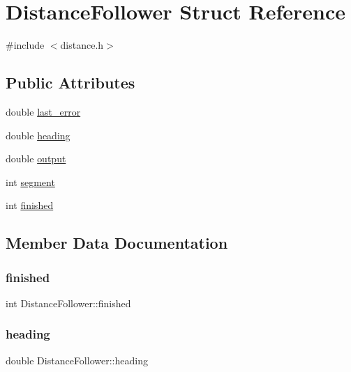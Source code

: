 \hypertarget{structDistanceFollower}{}\section{Distance\+Follower Struct Reference}
\label{structDistanceFollower}


{\ttfamily \#include $<$distance.\+h$>$}

\subsection*{Public Attributes}
\begin{DoxyCompactItemize}
\item 
double \mbox{\hyperlink{structDistanceFollower_a39217b0b0d11fac687ef1f7184e1662f}{last\+\_\+error}}
\item 
double \mbox{\hyperlink{structDistanceFollower_a4277eb5f873add0a3a9acb47288ee80e}{heading}}
\item 
double \mbox{\hyperlink{structDistanceFollower_ad45bcee91b5002738222ba423ed34ec5}{output}}
\item 
int \mbox{\hyperlink{structDistanceFollower_a47cfca5fa21eb4a7e3357900ff3f42e9}{segment}}
\item 
int \mbox{\hyperlink{structDistanceFollower_a2410a13b1d525a8f0852ae4abb51538e}{finished}}
\end{DoxyCompactItemize}


\subsection{Member Data Documentation}
\mbox{\label{structDistanceFollower_a2410a13b1d525a8f0852ae4abb51538e}} 
\subsubsection{\texorpdfstring{finished}{finished}}
{\footnotesize\ttfamily int Distance\+Follower\+::finished}

\mbox{\label{structDistanceFollower_a4277eb5f873add0a3a9acb47288ee80e}} 
\subsubsection{\texorpdfstring{heading}{heading}}
{\footnotesize\ttfamily double Distance\+Follower\+::heading}

